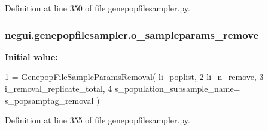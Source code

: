 Definition at line 350 of file genepopfilesampler.\+py.

\subsubsection[{\texorpdfstring{o\+\_\+sampleparams\+\_\+remove}{o_sampleparams_remove}}]{\setlength{\rightskip}{0pt plus 5cm}negui.\+genepopfilesampler.\+o\+\_\+sampleparams\+\_\+remove}\hypertarget{namespacenegui_1_1genepopfilesampler_ad3b275384232539ab49244138306a4ff}{}\label{namespacenegui_1_1genepopfilesampler_ad3b275384232539ab49244138306a4ff}
{\bfseries Initial value\+:}
\begin{DoxyCode}
1 = \hyperlink{classnegui_1_1genepopfilesampler_1_1GenepopFileSampleParamsRemoval}{GenepopFileSampleParamsRemoval}( li\_poplist,
2                                                             li\_n\_remove,
3                                                             i\_removal\_replicate\_total,
4                                                             s\_population\_subsample\_name=
      s\_popsamptag\_removal )
\end{DoxyCode}


Definition at line 355 of file genepopfilesampler.\+py.

